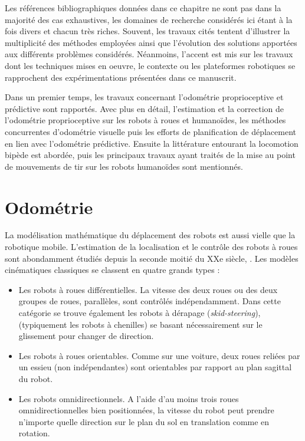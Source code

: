 
Les références bibliographiques données dans ce chapitre ne sont pas 
dans la majorité des cas exhaustives, les domaines de recherche considérés 
ici étant à la fois divers et chacun très riches.
Souvent, les travaux cités tentent d'illustrer la multiplicité des 
méthodes employées ainsi que l'évolution des solutions apportées aux 
différents problèmes considérés.
Néanmoins, l'accent est mis sur les travaux dont les techniques 
mises en oeuvre, le contexte ou les plateformes robotiques 
se rapprochent des expérimentations présentées dans ce manuscrit.

Dans un premier temps, les travaux concernant l'odométrie proprioceptive
et prédictive sont rapportés. Avec plus en détail, l'estimation et la correction
de l'odométrie proprioceptive sur les robots à roues et humanoïdes, 
les méthodes concurrentes d'odométrie visuelle
puis les efforts de planification de déplacement en lien avec l'odométrie prédictive.
Ensuite la littérature entourant la locomotion bipède est abordée,
puis les principaux travaux ayant traités de la mise au point de mouvements
de tir sur les robots humanoïdes sont mentionnés.

\section{Odométrie\label{sec:biblio_odometry}}

La modélisation mathématique du déplacement des robots 
est aussi vielle que la robotique mobile.
L'estimation de la localisation et le contrôle des robots à roues 
sont abondamment étudiés depuis la seconde moitié du XXe siècle, \cite{muir_kinematic_1987}.
Les modèles cinématiques classiques se classent en quatre grands types :
\begin{itemize}
    \item Les robots à roues différentielles. 
        La vitesse des deux roues ou des deux groupes de roues, parallèles,
        sont contrôlés indépendamment.
        Dans cette catégorie se trouve également les robots 
        à \og dérapage \fg (\textit{skid-steering}), 
        (typiquement les robots à chenilles) se basant nécessairement sur 
        le glissement pour changer de direction.
    \item Les robots à roues orientables. Comme sur une voiture, deux roues reliées
        par un essieu (non indépendantes) sont orientables par rapport au plan sagittal du robot.
    \item Les robots omnidirectionnels.
        A l'aide d'au moins trois roues omnidirectionnelles bien positionnées, 
        la vitesse du robot peut prendre n'importe quelle direction sur le plan
        du sol en translation comme en rotation.
    \newline
\end{itemize}

